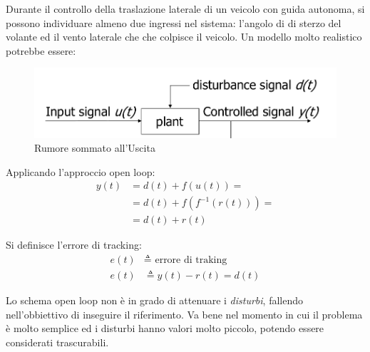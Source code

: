 \documentclass[12pt]{article}
\begin{document}
\begin{example}{}{}
Durante il controllo della traslazione laterale di un veicolo con guida autonoma, si possono individuare almeno due ingressi nel sistema: l'angolo di di sterzo del volante ed il vento laterale che che colpisce il veicolo. Un modello molto realistico potrebbe essere:
\begin{figure}[H]
    \centering
    \includegraphics[scale=0.3]{noise.png}
    \caption{Rumore sommato all'Uscita}
    \label{fig:noise}
\end{figure}

Applicando l'approccio open loop:
\begin{align*}
    y(t) & = d(t) + f(u(t)) = \\
         & = d(t) + f\left( f^{-1}(r(t)) \right) = \\
         & = d(t) + r(t)
\end{align*}

Si definisce l'errore di tracking:
\begin{align*}
    e(t) & \triangleq \text{ errore di traking} \\
    e(t) & \triangleq y(t) - r(t) = d(t)
\end{align*}
\end{example}

Lo schema open loop non \`e in grado di attenuare i \emph{disturbi}, fallendo nell'obbiettivo di inseguire il riferimento. Va bene nel momento in cui il problema \`e molto semplice ed i disturbi hanno valori molto piccolo, potendo essere considerati trascurabili.
\end{document}
